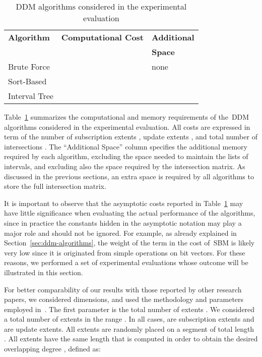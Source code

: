 \documentclass[10pt, conference, compsocconf]{IEEEtran}
\begin{document}
\begin{table}[t]
\caption{\ac{DDM} algorithms considered in the experimental evaluation}\label{tab:alg-summary}
\centering\begin{tabular}{lll}
\toprule
\textbf{Algorithm} & \textbf{Computational Cost} & \textbf{Additional} \\
& & \textbf{Space} \\
\midrule
Brute Force &  & none \\
Sort-Based &  &  \\
Interval Tree &  &  \\
\bottomrule
\end{tabular}
\end{table}

Table~\ref{tab:alg-summary} summarizes the computational and memory
requirements of the~\ac{DDM} algorithms considered in the experimental
evaluation. All costs are expressed in term of the number of
subscription extents , update extents , and total number of
intersections . The ``Additional Space'' column specifies the
additional memory required by each algorithm, excluding the space
needed to maintain the lists of intervals, and excluding also the
space required by the intersection matrix. As discussed in the
previous sections, an extra  space is required by all
algorithms to store the full intersection matrix.

It is important to observe that the asymptotic costs reported in
Table~\ref{tab:alg-summary} may have little significance when
evaluating the actual performance of the algorithms, since in practice
the constants hidden in the asymptotic notation may play a major role
and should not be ignored. For example, as already explained in
Section~\ref{sec:ddm-algorithms}, the weight of the term  in the
cost of~\ac{SBM} is likely very low since it is originated from simple
operations on bit vectors. For these reasons, we performed a set of
experimental evaluations whose outcome will be illustrated in this
section.

For better comparability of our results with those reported by other
research papers, we considered  dimensions, and used the
methodology and parameters employed in~\cite{Raczy2005}. The first
parameter is the total number of extents . We considered a total
number of extents in the range . In
all cases,  are subscription extents and  are update
extents. All extents are randomly placed on a segment of total length
. All extents have the same length  that is
computed in order to obtain the desired overlapping degree ,
defined as:
\end{document}

